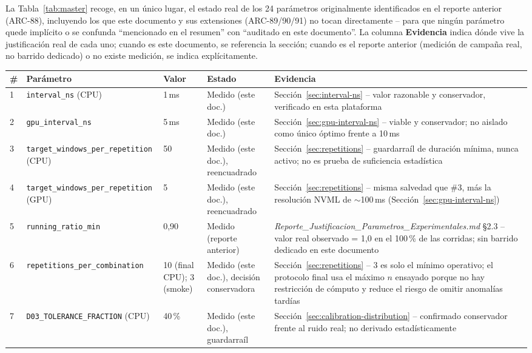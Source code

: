 La Tabla~\ref{tab:master} recoge, en un único lugar, el estado real de los
24 parámetros originalmente identificados en el reporte anterior (ARC-88),
incluyendo los que este documento y sus extensiones (ARC-89/90/91) no
tocan directamente -- para que ningún parámetro quede implícito o se
confunda ``mencionado en el resumen'' con ``auditado en este documento''.
La columna \textbf{Evidencia} indica dónde vive la justificación real de
cada uno; cuando es este documento, se referencia la sección; cuando es el
reporte anterior (medición de campaña real, no barrido dedicado) o no
existe medición, se indica explícitamente.

\begin{longtable}{@{}p{}p{}p{}p{}p{}@{}}
\toprule
\textbf{\#} & \textbf{Parámetro} & \textbf{Valor} & \textbf{Estado} & \textbf{Evidencia} \\
\midrule
\endhead
1  & \texttt{interval\_ns} (CPU) & 1\,ms & Medido (este doc.) & Sección~\ref{sec:interval-ns} -- valor razonable y conservador, verificado en esta plataforma \\
2  & \texttt{gpu\_interval\_ns} & 5\,ms & Medido (este doc.) & Sección~\ref{sec:gpu-interval-ns} -- viable y conservador; no aislado como único óptimo frente a 10\,ms \\
3  & \texttt{target\_windows\_per\_repetition} (CPU) & 50 & Medido (este doc.), reencuadrado & Sección~\ref{sec:repetitions} -- guardarraíl de duración mínima, nunca activo; no es prueba de suficiencia estadística \\
4  & \texttt{target\_windows\_per\_repetition} (GPU) & 5 & Medido (este doc.), reencuadrado & Sección~\ref{sec:repetitions} -- misma salvedad que \#3, más la resolución NVML de $\sim$100\,ms (Sección~\ref{sec:gpu-interval-ns}) \\
5  & \texttt{running\_ratio\_min} & 0{,}90 & Medido (reporte anterior) & \emph{Reporte\_Justificacion\_Parametros\_Experimentales.md} §2.3 -- valor real observado = 1{,}0 en el 100\,\% de las corridas; sin barrido dedicado en este documento \\
6  & \texttt{repetitions\_per\_combination} & 10 (final CPU); 3 (smoke) & Medido (este doc.), decisión conservadora & Sección~\ref{sec:repetitions} -- 3 es solo el mínimo operativo; el protocolo final usa el máximo $n$ ensayado porque no hay restricción de cómputo y reduce el riesgo de omitir anomalías tardías \\
7  & \texttt{D03\_TOLERANCE\_FRACTION} (CPU) & 40\,\% & Medido (este doc.), guardarraíl & Sección~\ref{sec:calibration-distribution} -- confirmado conservador frente al ruido real; no derivado estadísticamente \\

\end{longtable}
